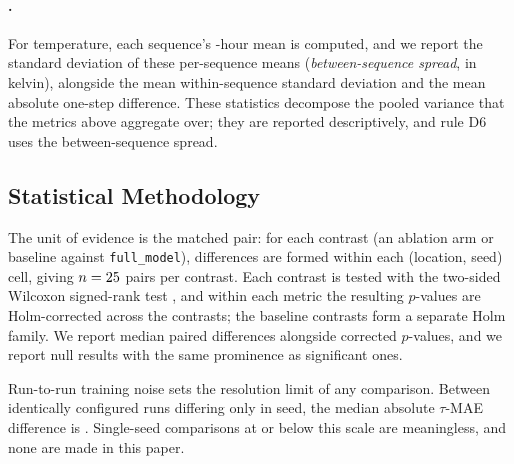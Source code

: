 \documentclass[preprint,12pt]{elsarticle}
\makeatletter
\let\ElsParagraph\paragraph
\def\StripRunInStop#1.\StripRunInMark#2\StripRunInEnd{#1}
\let\StripRunInMark\@empty
\renewcommand\paragraph[1]{\ElsParagraph{\StripRunInStop#1\StripRunInMark.\StripRunInMark\StripRunInEnd}}
\makeatother
\begin{document}
\paragraph{Sequence-level variance decomposition.}
For temperature, each sequence's \protoSeqLen-hour mean is computed, and we
report the standard deviation of these per-sequence means
(\emph{between-sequence spread}, in kelvin), alongside the mean
within-sequence standard deviation and the mean absolute one-step
difference.  These statistics decompose the pooled variance that the metrics above
aggregate over; they are reported descriptively, and rule D6 uses the
between-sequence spread.

\subsection{Statistical Methodology}
\label{sec:stats}

The unit of evidence is the matched pair: for each contrast
(an ablation arm or baseline against \texttt{full\_model}), differences
are formed within each (location, seed) cell, giving $n=25$ pairs per contrast.  Each contrast is tested with the two-sided Wilcoxon
signed-rank test \cite{wilcoxon1945}, and within each metric the
resulting $p$-values are Holm-corrected \cite{holm1979} across the
\protoNContrastsWord{} contrasts; the \protoNBaselinesWord{} baseline
contrasts form a separate Holm family.  We report median paired differences alongside
corrected $p$-values, and we report null results with the same
prominence as significant ones.

Run-to-run training noise sets the resolution limit of any comparison.
Between identically configured runs differing only in seed, the median
absolute $\tau$-MAE difference is \runNoiseDtau.  Single-seed
comparisons at or below this scale are meaningless, and none are made
in this paper.
\end{document}
